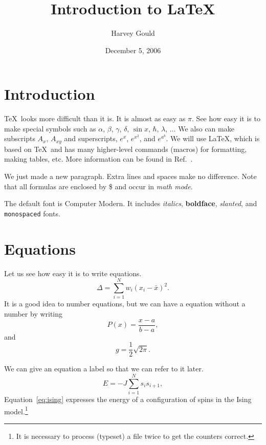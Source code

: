 \documentclass[prb,12pt]{revtex4}
\begin{document}
\title{Introduction to \LaTeX}
\author{Harvey Gould}
\date{December 5, 2006}

\maketitle

\section{Introduction}
\TeX\ looks more difficult than it is. It is
almost as easy as $\pi$. See how easy it is to make special
symbols such as $\alpha$,
$\beta$, $\gamma$,
$\delta$, $\sin x$, $\hbar$, $\lambda$, $\ldots$ We also can make
subscripts
$A_{x}$, $A_{xy}$ and superscripts, $e^x$, $e^{x^2}$, and
$e^{a^b}$. We will use \LaTeX, which is based on \TeX\ and has
many higher-level commands (macros) for formatting, making
tables, etc. More information can be found in Ref.~\cite{latex}.

We just made a new paragraph. Extra lines and spaces make no
difference. Note that all formulas are enclosed by
\$ and occur in \textit{math mode}.

The default font is Computer Modern. It includes \textit{italics},
\textbf{boldface},
\textsl{slanted}, and \texttt{monospaced} fonts.

\section{Equations}
Let us see how easy it is to write equations.
\begin{equation}
\Delta =\sum_{i=1}^N w_i (x_i - \bar{x})^2 .
\end{equation}
It is a good idea to number equations, but we can have a
equation without a number by writing
\begin{equation}
P(x) = \frac{x - a}{b - a} , \nonumber
\end{equation}
and
\begin{equation}
g = \frac{1}{2} \sqrt{2\pi} . \nonumber
\end{equation}

We can give an equation a label so that we can refer to it later.
\begin{equation}
\label{eq:ising}
E = -J \sum_{i=1}^N s_i s_{i+1} ,
\end{equation}
Equation~\eqref{eq:ising} expresses the energy of a configuration
of spins in the Ising model.\footnote{It is necessary to process (typeset) a
file twice to get the counters correct.}
\end{document}
